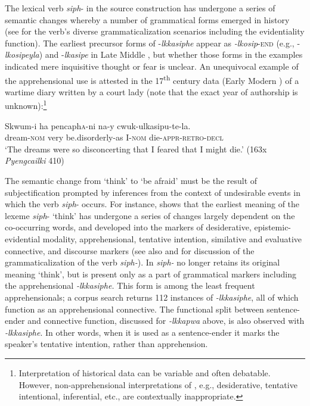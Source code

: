 \documentclass[output=paper,colorlinks,citecolor=brown]{langscibook}
\begin{document}
The lexical verb \textit{siph}- in the source construction has undergone a series of semantic changes whereby a number of grammatical forms emerged in history (see \citealt{Kim2010,Rhee2021a,Rheeforthcoming} for the verb's diverse grammaticalization scenarios including the evidentiality function). The earliest precursor forms of \nobreakdash-\textit{lkkasiphe} appear as \textit{-lkosip}-\textsc{end} (e.g., \nobreakdash-\textit{lkosipeyla}) and \nobreakdash-\textit{lkasipe} in Late Middle , but whether those forms in the examples indicated mere inquisitive thought or fear is unclear. An unequivocal example of the apprehensional use is attested in the 17\textsuperscript{th} century data (Early Modern ) of a wartime diary written by a court lady (note that the exact year of authorship is unknown):\footnote{Interpretation of historical data can be variable and often debatable. However, non-apprehensional interpretations of , e.g., desiderative, tentative intentional, inferential, etc., are contextually inappropriate.}   



\ea \label{ex:RK9}
\gll Skwum-i ha pencaph\textsc{a}-ni na-y cwuk-ulkasipu-te-la. \\
dream-\textsc{nom} very be.disorderly-as I-\textsc{nom} die-\textsc{appr}-\textsc{retro}-\textsc{decl} \\
\glt `The dreams were so disconcerting that I feared that I might die.' (163x \textit{Pyengcailki} 410)
\z



 The semantic change from `think' to `be afraid' must be the result of subjectification prompted by inferences from the context of undesirable events in which the verb \textit{siph}- occurs. For instance, \citet{Rheeforthcoming} shows that the earliest meaning of the lexeme \textit{siph}- `think' has undergone a series of changes largely dependent on the co-occurring words, and developed into the markers of desiderative, epistemic-evidential modality, apprehensional, tentative intention, similative and evaluative connective, and discourse markers (see also \citealt{Kim2010} and \citealt{Rhee2021a} for discussion of the grammaticalization of the verb \textit{siph-}). In  \textit{siph-} no longer retains its original meaning `think', but is present only as a part of grammatical markers including the apprehensional \textit{-lkkasiphe.} This form is  among the least frequent apprehensionals; a corpus search returns 112 instances of \textit{\nobreakdash-lkkasiphe}, all of which function as an apprehensional connective. The functional split between sentence-ender and connective function, discussed for \textit{-lkkapwa} above, is also observed with \textit{-lkkasiphe}. In other words, when it is used as a sentence-ender it marks the speaker's tentative intention, rather than apprehension. 
\end{document}
